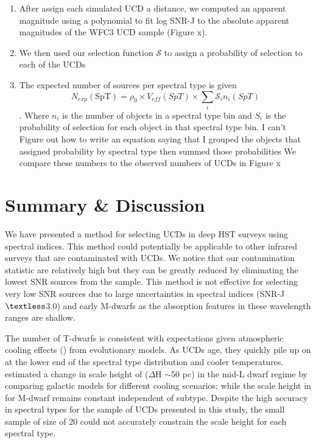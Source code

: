 \documentclass[manuscript]{aastex}
\begin{document}
\begin{enumerate}
\item After assign each simulated UCD a distance, we computed an apparent magnitude using a  polynomial to fit log SNR-J to the absolute apparent magnitudes of the WFC3 UCD sample (Figure x).

\item  We then used our selection function $\mathcal{S}$ to assign a probability of selection to each of the UCDs

\item  The expected number of sources per spectral type is given
\begin{equation}
N_{exp}(\text{SpT})=\rho_0 \times V_{eff} (SpT) \times \sum_{i} \mathcal{S}_i n_i (SpT)
\end{equation}. Where $n_i$ is the number of objects in a spectral type bin and $S_i$ is the probability of selection for each object in that spectral type bin. {\color{green} I can't Figure out how to write an equation saying that I grouped the objects that assigned probability by spectral type then summed those probabilities} We compare these numbers to the observed numbers of UCDs in Figure x

\end{enumerate}
\section{Summary \& Discussion}

We have presented a method for selecting UCDs in deep HST surveys using spectral indices. This method  could potentially be applicable to other infrared surveys that are contaminated  with UCDs. We notice that our contamination statistic are relatively high but they can be greatly reduced by eliminating the lowest SNR sources from the sample. This method is not effective for selecting very low SNR sources due to large uncertainties in spectral indices (SNR-J$\textless$3.0) and early M-dwarfs as the absorption features in these wavelength ranges are shallow.

The number of T-dwarfs is consistent with expectations given atmospheric cooling effects (\citealt{2004ApJS..155..191B}) from evolutionary models. As UCDs age, they quickly pile up on at the lower end of the spectral type distribution and cooler temperatures. \cite{Ryan2017} estimated a change in scale height of ($\Delta$H $\sim$50 pc) in the mid-L dwarf regime by comparing galactic models for different cooling scenarios; while the scale height in for M-dwarf remains constant independent of subtype. Despite the high accuracy in spectral types for the sample of UCDs presented in this study, the small sample of size of 20 could not accurately constrain the scale height for each spectral type.
\end{document}
